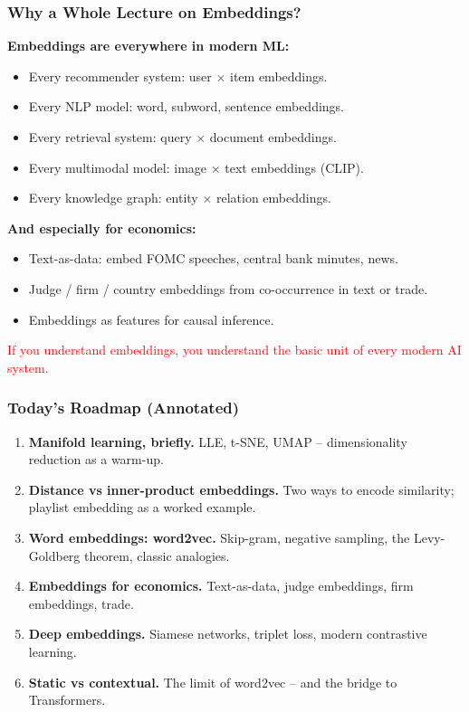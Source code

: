 \documentclass[notes,11pt, aspectratio=169]{beamer}
\begin{document}
\begin{frame}
\frametitle{Why a Whole Lecture on Embeddings?}

\textbf{Embeddings are everywhere in modern ML:}

\vspace{6pt}
\begin{itemize}
    \item Every recommender system: user $\times$ item embeddings.
    \item Every NLP model: word, subword, sentence embeddings.
    \item Every retrieval system: query $\times$ document embeddings.
    \item Every multimodal model: image $\times$ text embeddings (CLIP).
    \item Every knowledge graph: entity $\times$ relation embeddings.
\end{itemize}

\vspace{8pt}
\textbf{And especially for economics:}
\begin{itemize}
    \item Text-as-data: embed FOMC speeches, central bank minutes, news.
    \item Judge / firm / country embeddings from co-occurrence in text or trade.
    \item Embeddings as features for causal inference.
\end{itemize}

\vspace{6pt}
\textcolor{red}{If you understand embeddings, you understand the basic unit of every modern AI system.}
\end{frame}

\begin{frame}
\frametitle{Today's Roadmap (Annotated)}

\begin{enumerate}
    \item \textbf{Manifold learning, briefly.} LLE, t-SNE, UMAP -- dimensionality reduction as a warm-up.
    \item \textbf{Distance vs inner-product embeddings.} Two ways to encode similarity; playlist embedding as a worked example.
    \item \textbf{Word embeddings: word2vec.} Skip-gram, negative sampling, the Levy-Goldberg theorem, classic analogies.
    \item \textbf{Embeddings for economics.} Text-as-data, judge embeddings, firm embeddings, trade.
    \item \textbf{Deep embeddings.} Siamese networks, triplet loss, modern contrastive learning.
    \item \textbf{Static vs contextual.} The limit of word2vec -- and the bridge to Transformers.
\end{enumerate}
\end{frame}
\end{document}
